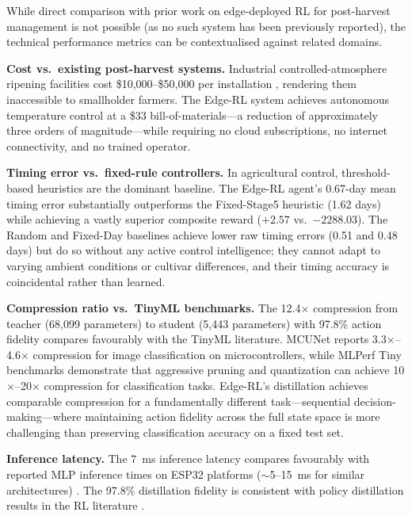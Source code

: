     While direct comparison with prior work on edge-deployed RL for post-harvest management is not possible (as no such system has been previously reported), the technical performance metrics can be contextualised against related domains.

    \textbf{Cost vs.\ existing post-harvest systems.} Industrial controlled-atmosphere ripening facilities cost \$10,000--\$50,000 per installation \citep{prasad2018}, rendering them inaccessible to smallholder farmers. The Edge-RL system achieves autonomous temperature control at a \$33 bill-of-materials---a reduction of approximately three orders of magnitude---while requiring no cloud subscriptions, no internet connectivity, and no trained operator.

    \textbf{Timing error vs.\ fixed-rule controllers.} In agricultural control, threshold-based heuristics are the dominant baseline. The Edge-RL agent's 0.67-day mean timing error substantially outperforms the Fixed-Stage5 heuristic (1.62 days) while achieving a vastly superior composite reward ($+2.57$ vs.\ $-2288.03$). The Random and Fixed-Day baselines achieve lower raw timing errors (0.51 and 0.48 days) but do so without any active control intelligence; they cannot adapt to varying ambient conditions or cultivar differences, and their timing accuracy is coincidental rather than learned.

    \textbf{Compression ratio vs.\ TinyML benchmarks.} The 12.4$\times$ compression from teacher (68,099 parameters) to student (5,443 parameters) with 97.8\% action fidelity compares favourably with the TinyML literature. MCUNet \citep{lin2020mcunet} reports 3.3$\times$--4.6$\times$ compression for image classification on microcontrollers, while MLPerf Tiny \citep{banbury2021mlperf} benchmarks demonstrate that aggressive pruning and quantization can achieve 10$\times$--20$\times$ compression for classification tasks. Edge-RL's distillation achieves comparable compression for a fundamentally different task---sequential decision-making---where maintaining action fidelity across the full state space is more challenging than preserving classification accuracy on a fixed test set.

    \textbf{Inference latency.} The 7~ms inference latency compares favourably with reported MLP inference times on ESP32 platforms ($\sim$5--15~ms for similar architectures) \citep{warden2019tinyml}. The 97.8\% distillation fidelity is consistent with policy distillation results in the RL literature \citep{ruffy2019distilling}.

